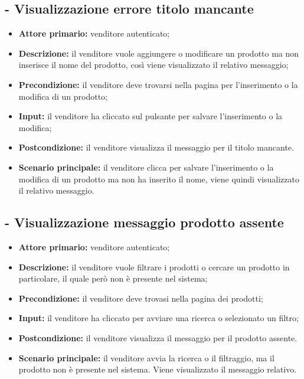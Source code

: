 \subsection{ - Visualizzazione errore titolo mancante}
\begin{itemize}
    \item \textbf{Attore primario:} venditore autenticato;
    \item \textbf{Descrizione:} il venditore vuole aggiungere o modificare un prodotto ma non inserisce il nome del prodotto, così viene visualizzato il relativo messaggio;
    \item \textbf{Precondizione:} il venditore deve trovarsi nella pagina per l'inserimento o la modifica di un prodotto;
    \item \textbf{Input:} il venditore ha cliccato sul pulsante per salvare l'inserimento o la modifica;
    \item \textbf{Postcondizione:} il venditore visualizza il messaggio per il titolo mancante.
    \item \textbf{Scenario principale:} il venditore clicca per salvare l'inserimento o la modifica di un prodotto ma non ha inserito il nome, viene quindi visualizzato il relativo messaggio.
\end{itemize}

\stepUserCase
\subsection{ - Visualizzazione messaggio prodotto assente}
\begin{itemize}
    \item \textbf{Attore primario:} venditore autenticato;
    \item \textbf{Descrizione:} il venditore vuole filtrare i prodotti o cercare un prodotto in particolare, il quale però non è presente nel sistema;
    \item \textbf{Precondizione:} il venditore deve trovasi nella pagina dei prodotti;
    \item \textbf{Input:} il venditore ha cliccato per avviare una ricerca o selezionato un filtro;
    \item \textbf{Postcondizione:} il venditore visualizza il messaggio per il prodotto assente.
    \item \textbf{Scenario principale:} il venditore avvia la ricerca o il filtraggio, ma il prodotto non è presente nel sistema. Viene visualizzato il messaggio relativo.
\end{itemize}

